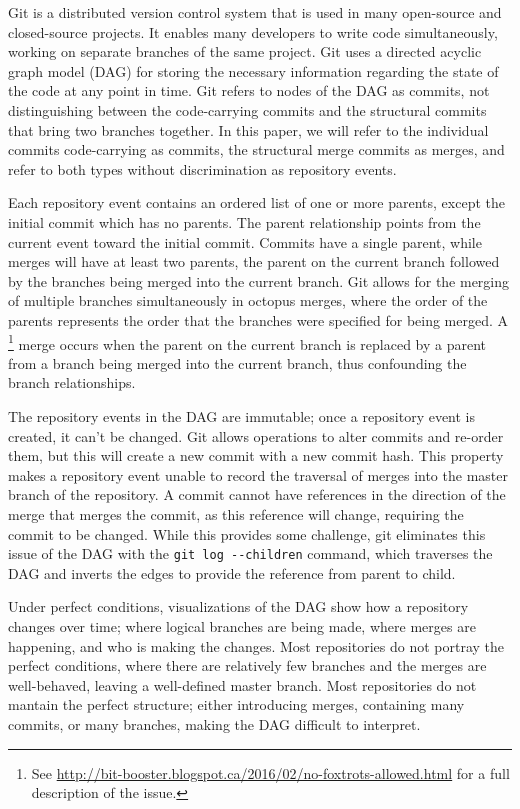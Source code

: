 
Git is a distributed version control system that is used in many
open-source and closed-source projects. It enables many developers to
write code simultaneously, working on separate branches of the same
project. Git uses a directed acyclic graph model (DAG) for storing the
necessary information regarding the state of the code at any point in
time. Git refers to nodes of the DAG as commits, not distinguishing
between the code-carrying commits and the structural commits that bring
two branches together. In this paper, we will refer to the individual
commits code-carrying as commits, the structural merge commits as
merges, and refer to both types without discrimination as repository
events.

Each repository event contains an ordered list of one or more parents,
except the initial commit which has no parents. The parent relationship
points from the current event toward the initial commit.  Commits have a
single parent, while merges will have at least two parents, the parent
on the current branch followed by the branches being merged into the
current branch. Git allows for the merging of multiple branches
simultaneously in octopus merges, where the order of the parents
represents the order that the branches were specified for being merged.
A \foxtrot\footnote{See
  \url{http://bit-booster.blogspot.ca/2016/02/no-foxtrots-allowed.html}
  for a full description of the issue.} merge occurs when the parent on
the current branch is replaced by a parent from a branch being merged
into the current branch, thus confounding the branch relationships.

The repository events in the DAG are immutable; once a repository event
is created, it can't be changed. Git allows operations to alter commits
and re-order them, but this will create a new commit with a new commit
hash.  This property makes a repository event unable to record the
traversal of merges into the master branch of the repository. A commit
cannot have references in the direction of the merge that merges the
commit, as this reference will change, requiring the commit to be
changed. While this provides some challenge, git eliminates this issue
of the DAG with the \verb|git log --children| command, which traverses
the DAG and inverts the edges to provide the reference from parent to
child.

Under perfect conditions, visualizations of the DAG show how a
repository changes over time; where logical branches are being made,
where merges are happening, and who is making the changes. Most
repositories do not portray the perfect conditions, where there are
relatively few branches and the merges are well-behaved, leaving a
well-defined master branch. Most repositories do not mantain the perfect
structure; either introducing \foxtrot merges, containing many commits,
or many branches, making the DAG difficult to interpret.

